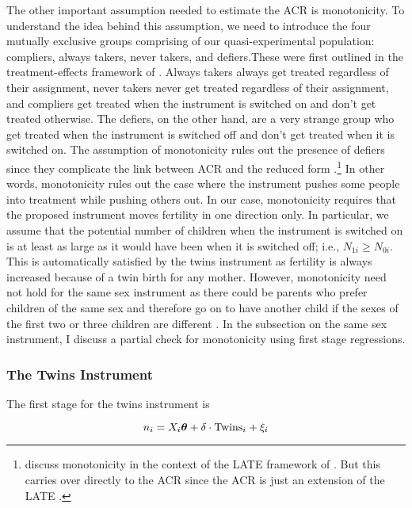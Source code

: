 The other important assumption needed to estimate the ACR is monotonicity. To understand the idea behind this assumption, we need to introduce the four mutually exclusive groups comprising of our quasi-experimental population: compliers, always takers, never takers, and defiers.These were first outlined in the treatment-effects framework of \cite{angrist_identification_1996}.  Always takers always get treated regardless of their assignment, never takers never get treated regardless of their assignment, and compliers get treated when the instrument is switched on and don't get treated otherwise. The defiers, on the other hand, are a very strange group who get treated when the instrument is switched off and don't get treated when it is switched on. The assumption of monotonicity rules out the presence of defiers since they complicate the link between ACR and the reduced form \parencite{Angrist2009}.\footnote{\cite{Angrist2009} discuss monotonicity in the context of the LATE framework of \cite{imbens_identification_1994}. But this carries over directly to the ACR since the ACR is just an extension of the LATE \parencite[see][p.~181]{Angrist2009}.}  In other words, monotonicity rules out the case where the instrument pushes some people into treatment while pushing others out. In our case, monotonicity requires that the proposed instrument moves fertility in one direction only. In particular, we assume that the potential number of children when the instrument is switched on is at least as large as it would have been when it is switched off; i.e., $ N_{1i} \geq N_{0i} $. This is automatically satisfied by the twins instrument as fertility is always increased because of a twin birth for any mother. However, monotonicity need not hold for the same sex instrument as there could be parents who prefer children of the same sex and therefore go on to have another child if the sexes of the first two or three children are different \parencite{Huber2015}. In the subsection on the same sex instrument, I discuss a partial check for monotonicity using first stage regressions. 



\subsubsection{The Twins Instrument}

The first stage for the twins instrument is

\begin{equation}\label{eq:05}
	n_{i} = X_{i}\boldsymbol{\theta} + \delta\cdot {\rm Twins }_{i} + \xi_{i}
\end{equation}

